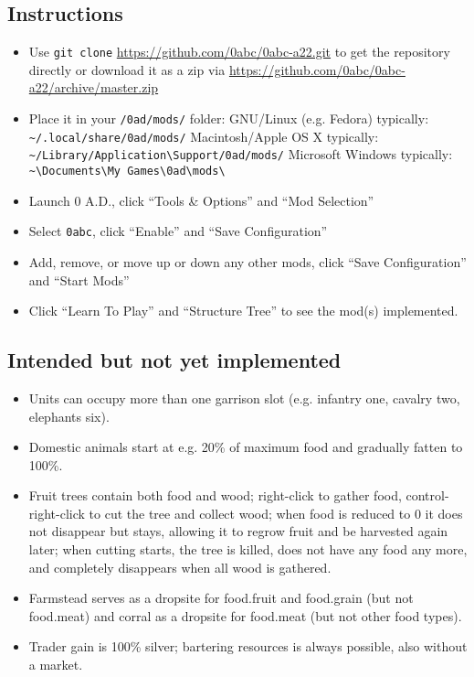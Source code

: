 \documentclass{article}
\begin{document}
\subsection{Instructions}
\begin{itemize}
  \item Use \texttt{git clone} \url{https://github.com/0abc/0abc-a22.git} to get the repository directly or download it as a zip via \url{https://github.com/0abc/0abc-a22/archive/master.zip}
  \item Place it in your \texttt{/0ad/mods/} folder:
  \subitem GNU/Linux (e.g. Fedora) typically: \verb+~/.local/share/0ad/mods/+
  \subitem Macintosh/Apple OS X typically: \verb+~/Library/Application\Support/0ad/mods/+
  \subitem Microsoft Windows typically: \verb+~\Documents\My Games\0ad\mods\+
  \item Launch 0 A.D., click ``Tools \& Options'' and ``Mod Selection''
  \item Select \texttt{0abc}, click ``Enable'' and ``Save Configuration''
  \item Add, remove, or move up or down any other mods, click ``Save Configuration'' and ``Start Mods''
  \item Click ``Learn To Play'' and ``Structure Tree'' to see the mod(s) implemented.
\end{itemize}

\subsection{Intended but not yet implemented}
\begin{itemize}
  \item Units can occupy more than one garrison slot (e.g. infantry one, cavalry two, elephants six).
  \item Domestic animals start at e.g. 20\% of maximum food and gradually fatten to 100\%.
  \item Fruit trees contain both food and wood; right-click to gather food, control-right-click to cut the tree and collect wood; when food is reduced to 0 it does not disappear but stays, allowing it to regrow fruit and be harvested again later; when cutting starts, the tree is killed, does not have any food any more, and completely disappears when all wood is gathered.
  \item Farmstead serves as a dropsite for food.fruit and food.grain (but not food.meat) and corral as a dropsite for food.meat (but not other food types).
  \item Trader gain is 100\% silver; bartering resources is always possible, also without a market.
\end{itemize}
\end{document}
